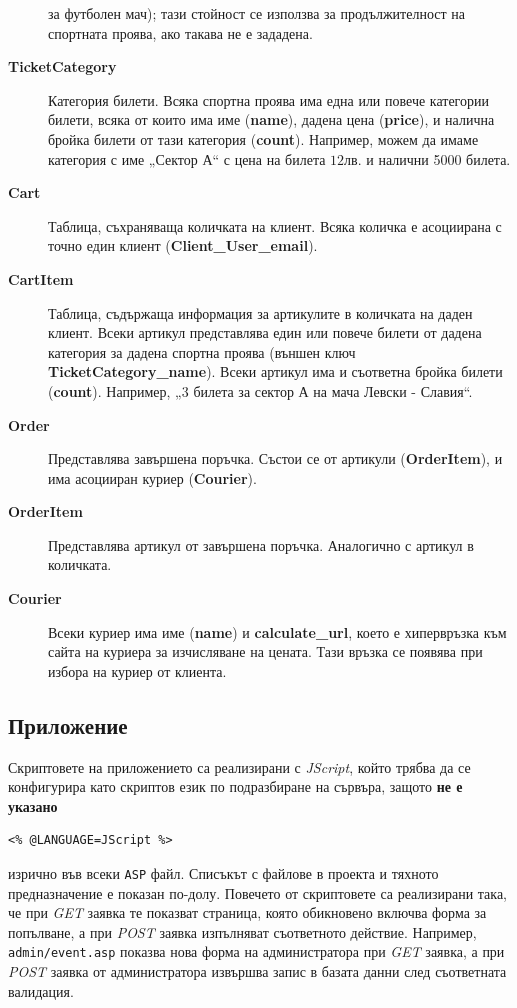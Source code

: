 \documentclass[a4paper,10pt, leqno]{article}
\newcommand{\term}[1] {\textsl{#1}}
\newcommand{\tab}[1] {\textbf{#1}}
\newcommand{\col}[1] {\textbf{#1}}
\newcommand{\File}[1] {\texttt{#1}}
\begin{document}
\begin{description}
        за футболен мач); тази стойност се използва за продължителност на спортната проява, ако такава не е зададена.
    \item[\tab{TicketCategory}]
        Категория билети. Всяка спортна проява има една или повече категории билети, всяка от които има име (\col{name}), дадена цена (\col{price}),
        и налична бройка билети от тази категория (\col{count}). Например, можем да имаме категория с име „Сектор А“ с цена на билета $12$лв. и
        налични 5000 билета.
    \item[\tab{Cart}]
        Таблица, съхраняваща количката на клиент. Всяка количка е асоциирана с точно един клиент (\col{Client\_User\_email}).
    \item[\tab{CartItem}]
        Таблица, съдържаща информация за артикулите в количката на даден клиент. Всеки артикул представлява един или повече
        билети от дадена категория за дадена спортна проява (външен ключ \col{TicketCategory\_name}). Всеки артикул има и съответна
        бройка билети (\col{count}). Например, „3 билета за сектор А на мача Левски - Славия“.
    \item[\tab{Order}]
        Представлява завършена поръчка. Състои се от артикули (\tab{OrderItem}), и има асоцииран куриер (\tab{Courier}).
    \item[\tab{OrderItem}]
        Представлява артикул от завършена поръчка. Аналогично с артикул в количката.
    \item[\tab{Courier}]
        Всеки куриер има име (\col{name}) и \col{calculate\_url}, което е хипервръзка към сайта на куриера за изчисляване на цената.
        Тази връзка се появява при избора на куриер от клиента.
\end{description}

\subsection{Приложение}
Скриптовете на приложението са реализирани с \term{JScript}, който трябва да се конфигурира като скриптов език
по подразбиране на сървъра, защото \textbf{не е указано}

\begin{verbatim}
<% @LANGUAGE=JScript %>
\end{verbatim}
изрично във всеки \texttt{ASP} файл.
Списъкът с файлове в проекта и тяхното предназначение е показан по-долу.
Повечето от скриптовете са реализирани така, че при \term{GET} заявка те показват страница, която обикновено включва форма
за попълване, а при \term{POST} заявка изпълняват съответното действие.
Например, \File{admin/event.asp} показва нова форма на администратора при \term{GET} заявка, а при \term{POST} заявка от администратора
извършва запис в базата данни след съответната валидация.
\end{document}

